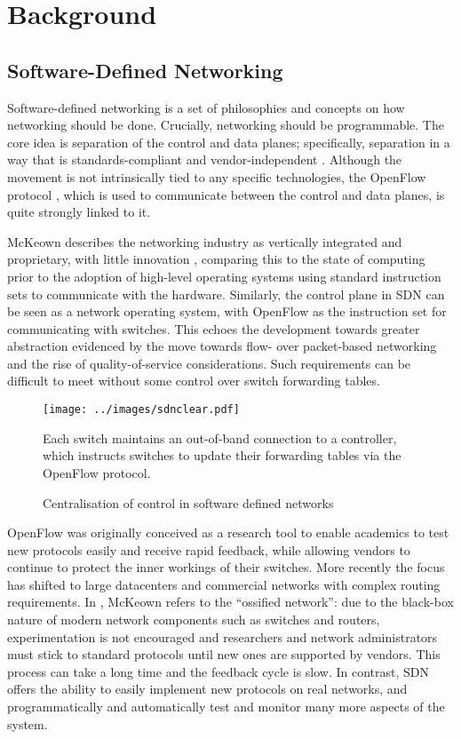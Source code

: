 \chapter{Background}
\label{ch:background}

\section{Software-Defined Networking}
Software-defined networking is a set of philosophies and concepts on how networking should be done. Crucially, networking should be programmable. The core idea is separation of the control and data planes; specifically, separation in a way that is standards-compliant and vendor-independent \cite{onf:sdn}. Although the movement is not intrinsically tied to any specific technologies, the OpenFlow protocol \cite{onf:switch140}, which is used to communicate between the control and data planes, is quite strongly linked to it.

McKeown describes the networking industry as vertically integrated and proprietary, with little innovation \cite{mckeown:sdn}, comparing this to the state of computing prior to the adoption of high-level operating systems using standard instruction sets to communicate with the hardware. Similarly, the control plane in SDN can be seen as a network operating system, with OpenFlow as the instruction set for communicating with switches. This echoes the development towards greater abstraction evidenced by the move towards flow- over packet-based networking and the rise of quality-of-service considerations. Such requirements can be difficult to meet without some control over switch forwarding tables.

\begin{figure}
  \centering
  \texttt{[image: ../images/sdnclear.pdf]}
  \caption{Centralisation of control in software defined networks}
  Each switch maintains an out-of-band connection to a controller, which instructs switches to update their forwarding tables via the OpenFlow protocol.
  \label{fig:sdn}
\end{figure}

OpenFlow was originally conceived \cite{mckeown:openflow} as a research tool to enable academics to test new protocols easily and receive rapid feedback, while allowing vendors to continue to protect the inner workings of their switches. More recently \cite{onf:sdn} the focus has shifted to large datacenters and commercial networks with complex routing requirements. In \cite{mckeown:sdn}, McKeown refers to the  ``ossified network'': due to the black-box nature of modern network components such as switches and routers, experimentation is not encouraged and researchers and network administrators must stick to standard protocols until new ones are supported by vendors. This process can take a long time and the feedback cycle is slow. In contrast, SDN offers the ability to easily implement new protocols on real networks, and programmatically and automatically test and monitor many more aspects of the system.

